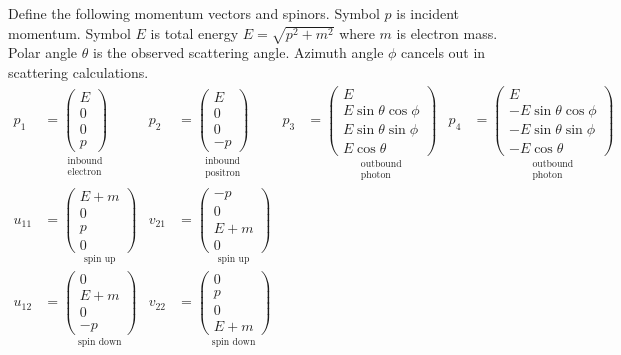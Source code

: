 \documentclass[12pt]{article}
\begin{document}
Define the following momentum vectors and spinors.
Symbol $p$ is incident momentum.
Symbol $E$ is total energy $E=\sqrt{p^2+m^2}$ where $m$ is electron mass.
Polar angle $\theta$ is the observed scattering angle.
Azimuth angle $\phi$ cancels out in scattering calculations.
\iffalse
\begin{align*}
p_1&=
\underset{\substack{\text{inbound}\\\text{electron}}}
{
\begin{pmatrix}E\\0\\0\\p\end{pmatrix}
}
&
p_2&=
\underset{\substack{\text{inbound}\\\text{positron}}}
{
\begin{pmatrix}E\\0\\0\\-p\end{pmatrix}
}
&
p_3&=
\underset{\substack{\text{outbound}\\\text{photon}}}
{
\begin{pmatrix}E\\ E\sin\theta\cos\phi\\ E\sin\theta\sin\phi\\ E\cos\theta\end{pmatrix}
}
&
p_4&=
\underset{\substack{\text{outbound}\\\text{photon}}}
{
\begin{pmatrix}E\\ -E\sin\theta\cos\phi\\ -E\sin\theta\sin\phi\\ -E\cos\theta\end{pmatrix}
}
\\[1ex]
u_{11}&=
\underset{\text{spin up}}
{
\begin{pmatrix}E+m\\0\\p\\0\end{pmatrix}
}
&
v_{21}&=
\underset{\text{spin up}}
{
\begin{pmatrix}-p\\0\\E+m\\0\end{pmatrix}
}
\\[1ex]
u_{12}&=
\underset{\text{spin down}}
{
\begin{pmatrix}0\\E+m\\0\\-p\end{pmatrix}
}
&
v_{22}&=
\underset{\text{spin down}}
{
\begin{pmatrix}0\\p\\0\\E+m\end{pmatrix}
}
\end{align*}
\end{document}
